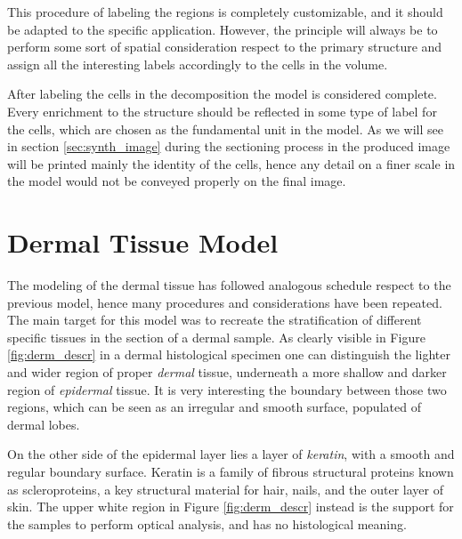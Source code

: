     This procedure of labeling the regions is completely customizable, and it should be adapted to the specific application. However, the principle will always be to perform some sort of spatial consideration respect to the primary structure and assign all the interesting labels accordingly to the cells in the volume.

    After labeling the cells in the decomposition the model is considered complete. Every enrichment to the structure should be reflected in some type of label for the cells, which are chosen as the fundamental unit in the model. As we will see in section \ref{sec:synth_image} during the sectioning process in the produced image will be printed mainly the identity of the cells, hence any detail on a finer scale in the model would not be conveyed properly on the final image.

\section{Dermal Tissue Model} \label{ssec:derm_tis_mod}
    The modeling of the dermal tissue has followed analogous schedule respect to the previous model, hence many procedures and considerations have been repeated. The main target for this model was to recreate the stratification of different specific tissues in the section of a dermal sample. As clearly visible in Figure \ref{fig:derm_descr} in a dermal histological specimen one can distinguish the lighter and wider region of proper \textit{dermal} tissue, underneath a more shallow and darker region of \textit{epidermal} tissue. It is very interesting the boundary between those two regions, which can be seen as an irregular and smooth surface, populated of dermal lobes.

    On the other side of the epidermal layer lies a layer of \textit{keratin}, with a smooth and regular boundary surface. Keratin is a family of fibrous structural proteins known as scleroproteins, a key structural material for hair, nails, and the outer layer of skin. The upper white region in Figure \ref{fig:derm_descr} instead is the support for the samples to perform optical analysis, and has no histological meaning.

